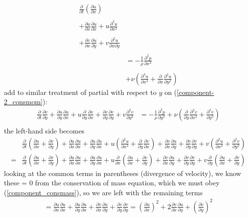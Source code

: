 \documentclass[11pt]{article}
\newcommand{\D}[2][]{\frac{\partial#1}{\partial#2}}
\begin{document}
\begin{align}
\frac{\partial}{\partial t} \left( \frac{\partial u}{\partial x} \right) &
	\nonumber \\ \nonumber \\
+ \frac{\partial u}{\partial x} \frac{\partial u}{\partial x}
 + u \frac{\partial^2 u}{\partial x^2}	 &
	\nonumber \\ \nonumber \\
+ \frac{\partial v}{\partial x} \frac{\partial u}{\partial y}
 + v \frac{\partial^2 u}{\partial x \partial y}
 	\nonumber \\ \nonumber \\
& = -\frac{1}{\rho} \frac{\partial^2 p}{\partial x^2}
	\nonumber \\ \nonumber \\
& + \nu \left( \D[^3u]{x^3} + \D{x} \D[^2u]{y^2} \right)
	\nonumber %
\end{align}
add to similar treatment of partial with respect to $y$ on (\ref{component-2_consmom}):
\begin{align}
\D{t} \D[v]{y} + \D[u]{y}\D[u]{x} + u \D{y}\D[v]{x} + \D[v]{y}\D[v]{y} + v \D[^2 v]{y^2}
& = -\frac{1}{\rho} \frac{\partial^2 p}{\partial y^2}
 + \nu \left( \D{y} \D[^2v]{x^2} + \D[^3v]{y^3} \right)
	\nonumber \\ \nonumber
\end{align}
the left-hand side becomes
\begin{align}
&\D{t} \left( \D[u]{x} + \D[v]{y} \right)
	+ \D[u]{x}\D[u]{x} + \D[u]{y}\D[u]{x}
	+ u \left( \D[^2u]{x^2} + \D{y}\D[v]{x} \right)
	+ \D[v]{x}\D[u]{y} + \D[v]{y}\D[v]{y}
	+ v \left( \D[^2u]{x^2} + \D[^2v]{y^2} \right)
	\nonumber \\ \nonumber
= &\D{t} \left( \D[u]{x} + \D[v]{y} \right)
	+ \D[u]{x}\D[u]{x} + \D[u]{y}\D[u]{x}
	+ u \D{x} \left( \D[u]{x} + \D[v]{y} \right)
	+ \D[v]{x}\D[u]{y} + \D[v]{y}\D[v]{y}
	+ v \D{y} \left( \D[u]{x} + \D[v]{y} \right)
\end{align}
looking at the common terms in parentheses (divergence of velocity),
we know these = 0 from the conservation of mass equation, which we must obey
 (\ref{component_consmass}), so we are left with the remaining terms
\begin{align}
= \D[u]{x}\D[u]{x} + \D[u]{y}\D[u]{x}
	+ \D[v]{x}\D[u]{y} + \D[v]{y}\D[v]{y}
= \left(\D[u]{x}\right)^2 + 2\D[v]{x}\D[u]{y} + \left(\D[v]{y}\right)^2
\label{lhs}
\end{align}
\end{document}
